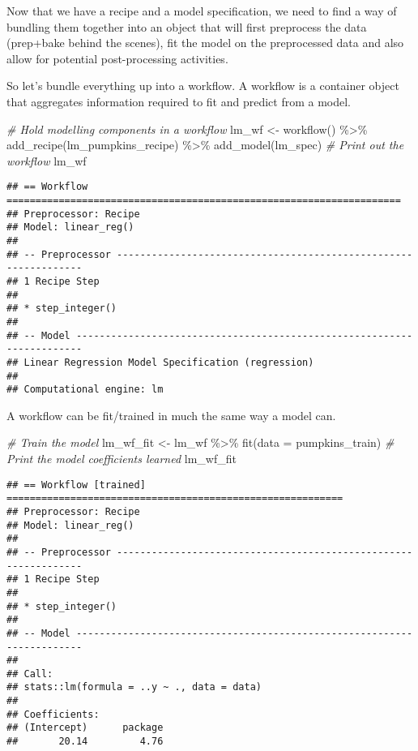 \documentclass[
]{article}
\newenvironment{Shaded}{\begin{snugshade}}{\end{snugshade}}
\newcommand{\AttributeTok}[1]{\textcolor[rgb]{0.77,0.63,0.00}{#1}}
\newcommand{\CommentTok}[1]{\textcolor[rgb]{0.56,0.35,0.01}{\textit{#1}}}
\newcommand{\FunctionTok}[1]{\textcolor[rgb]{0.00,0.00,0.00}{#1}}
\newcommand{\NormalTok}[1]{#1}
\newcommand{\OtherTok}[1]{\textcolor[rgb]{0.56,0.35,0.01}{#1}}
\newcommand{\SpecialCharTok}[1]{\textcolor[rgb]{0.00,0.00,0.00}{#1}}
\begin{document}
Now that we have a recipe and a model specification, we need to find a
way of bundling them together into an object that will first preprocess
the data (prep+bake behind the scenes), fit the model on the
preprocessed data and also allow for potential post-processing
activities.

So let's bundle everything up into a workflow. A workflow is a container
object that aggregates information required to fit and predict from a
model.

\begin{Shaded}
\begin{Highlighting}[]
\CommentTok{\# Hold modelling components in a workflow}
\NormalTok{lm\_wf }\OtherTok{\textless{}{-}} \FunctionTok{workflow}\NormalTok{() }\SpecialCharTok{\%\textgreater{}\%} 
  \FunctionTok{add\_recipe}\NormalTok{(lm\_pumpkins\_recipe) }\SpecialCharTok{\%\textgreater{}\%} 
  \FunctionTok{add\_model}\NormalTok{(lm\_spec)}
\CommentTok{\# Print out the workflow}
\NormalTok{lm\_wf}
\end{Highlighting}
\end{Shaded}

\begin{verbatim}
## == Workflow ====================================================================
## Preprocessor: Recipe
## Model: linear_reg()
## 
## -- Preprocessor ----------------------------------------------------------------
## 1 Recipe Step
## 
## * step_integer()
## 
## -- Model -----------------------------------------------------------------------
## Linear Regression Model Specification (regression)
## 
## Computational engine: lm
\end{verbatim}

A workflow can be fit/trained in much the same way a model can.

\begin{Shaded}
\begin{Highlighting}[]
\CommentTok{\# Train the model}
\NormalTok{lm\_wf\_fit }\OtherTok{\textless{}{-}}\NormalTok{ lm\_wf }\SpecialCharTok{\%\textgreater{}\%} 
  \FunctionTok{fit}\NormalTok{(}\AttributeTok{data =}\NormalTok{ pumpkins\_train)}
\CommentTok{\# Print the model coefficients learned }
\NormalTok{lm\_wf\_fit}
\end{Highlighting}
\end{Shaded}

\begin{verbatim}
## == Workflow [trained] ==========================================================
## Preprocessor: Recipe
## Model: linear_reg()
## 
## -- Preprocessor ----------------------------------------------------------------
## 1 Recipe Step
## 
## * step_integer()
## 
## -- Model -----------------------------------------------------------------------
## 
## Call:
## stats::lm(formula = ..y ~ ., data = data)
## 
## Coefficients:
## (Intercept)      package  
##       20.14         4.76
\end{verbatim}
\end{document}
